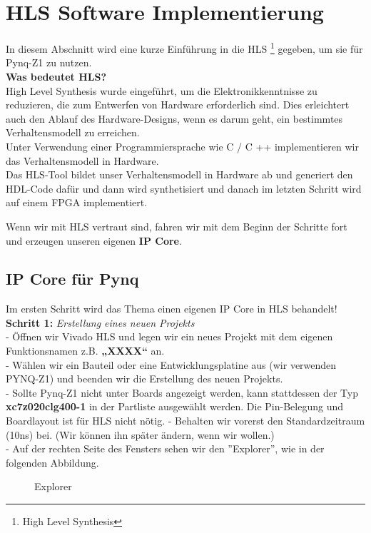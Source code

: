 \documentclass[a4paper]{report}
\begin{document}
\section{HLS Software Implementierung}
In diesem Abschnitt wird eine kurze Einführung in die HLS \footnote{High Level Synthesis} gegeben, um sie für Pynq-Z1 zu nutzen.\\
\textbf{Was bedeutet HLS?}\\
 High Level Synthesis wurde eingeführt, um die Elektronikkenntnisse zu reduzieren, die zum Entwerfen von Hardware erforderlich sind. Dies erleichtert auch den Ablauf des Hardware-Designs, wenn es darum geht, ein bestimmtes Verhaltensmodell zu erreichen.\\
 Unter Verwendung einer Programmiersprache wie C / C ++ implementieren wir das Verhaltensmodell in Hardware. \\
 Das HLS-Tool bildet unser Verhaltensmodell in Hardware ab und generiert den HDL-Code dafür und dann wird synthetisiert und danach im letzten Schritt wird  auf einem FPGA implementiert.

Wenn wir mit HLS vertraut sind, fahren wir mit dem Beginn der Schritte fort und erzeugen unseren eigenen \textbf{IP Core}.
\subsection{IP Core für Pynq}
Im ersten Schritt wird das Thema einen eigenen IP Core in HLS behandelt!\\

\textbf{Schritt 1:} \textit{Erstellung eines neuen Projekts}\\
- Öffnen wir Vivado HLS und legen wir ein neues Projekt mit dem eigenen Funktionsnamen z.B. \textbf{„XXXX“} an.\\
- Wählen wir ein Bauteil oder eine Entwicklungsplatine aus (wir verwenden PYNQ-Z1) und
 beenden wir die Erstellung des neuen Projekts.\\
 - Sollte Pynq-Z1 nicht unter Boards angezeigt werden, kann stattdessen der Typ \textbf{xc7z020clg400-1} in der Partliste ausgewählt werden. Die Pin-Belegung und Boardlayout ist für HLS nicht nötig. 
- Behalten wir vorerst den Standardzeitraum (10ns) bei. (Wir können ihn später ändern, wenn wir wollen.)\\
- Auf der rechten Seite des Fensters sehen wir den ''Explorer'', wie in der folgenden Abbildung.\\
\begin{figure}[H]
\centering
{}
\caption{Explorer}
\label{fig:Explorer}
\end{figure}
\end{document}
